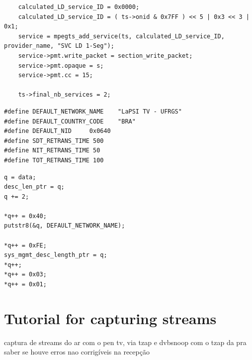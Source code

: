 \documentclass[
	12pt,				%
	openright,			%
	twoside,			%
	a4paper,			%
	brazil,
	french,				%
	english
	]{abntex2}
\begin{document}
\begin{apendicesenv}
\begin{lstlisting}
	calculated_LD_service_ID = 0x0000;
	calculated_LD_service_ID = ( ts->onid & 0x7FF ) << 5 | 0x3 << 3 | 0x1;
	service = mpegts_add_service(ts, calculated_LD_service_ID, provider_name, "SVC LD 1-Seg");
	service->pmt.write_packet = section_write_packet;
	service->pmt.opaque = s;
	service->pmt.cc = 15;
	
	ts->final_nb_services = 2;
\end{lstlisting}

\begin{lstlisting}[caption={Created macros.}, label={lst_macros}]
#define DEFAULT_NETWORK_NAME    "LaPSI TV - UFRGS"
#define DEFAULT_COUNTRY_CODE    "BRA"
#define DEFAULT_NID		0x0640
#define SDT_RETRANS_TIME 500
#define NIT_RETRANS_TIME 50
#define TOT_RETRANS_TIME 100
\end{lstlisting}

\begin{lstlisting}[caption={.}, label={lst_pointer_assignment}]
q = data;
desc_len_ptr = q;
q += 2;

*q++ = 0x40;
putstr8(&q, DEFAULT_NETWORK_NAME);

*q++ = 0xFE;
sys_mgmt_desc_length_ptr = q;
*q++;
*q++ = 0x03;
*q++ = 0x01;
\end{lstlisting}

\chapter{Tutorial for capturing streams}

captura de streams do ar com o pen tv, via tzap e dvbsnoop
	com o tzap da pra saber se houve erros nao corrigíveis na recepção


\end{apendicesenv}


\end{document}
